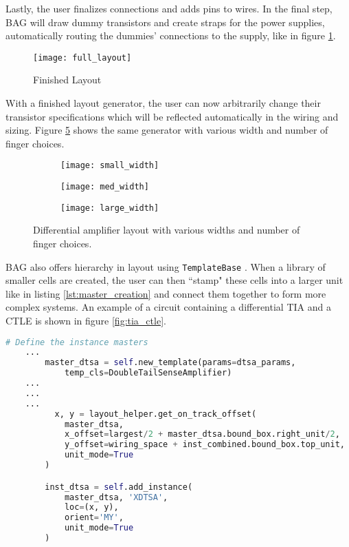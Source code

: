 Lastly, the user finalizes connections and adds pins to wires. In the final step, BAG will draw dummy transistors and create straps for the power supplies, automatically routing the dummies' connections to the supply, like in figure \ref{fig:finished_layout}.
\begin{figure}[h]
\centering
\texttt{[image: full\_layout]}
\caption{Finished Layout}
\label{fig:finished_layout}
\end{figure}
With a finished layout generator, the user can now arbitrarily change their transistor specifications which will be reflected automatically in the wiring and sizing. Figure \ref{fig:width_changes} shows the same generator with various width and number of finger choices.
\begin{figure}[h]
\centering
\begin{subfigure}{.4\linewidth}
  \centering
  \texttt{[image: small\_width]}
  \caption{}
  \label{fig:sfig1}
\end{subfigure}
\begin{subfigure}{.4\linewidth}
  \centering
\texttt{[image: med\_width]}
  \caption{}
  \label{fig:sfig2}
\end{subfigure}
\begin{subfigure}{.4\linewidth}
  \centering
\texttt{[image: large\_width]}
  \caption{}
  \label{fig:sfig2}
\end{subfigure}
\caption{Differential amplifier layout with various widths and number of finger choices.}
\label{fig:width_changes}
\end{figure}
\clearpage
BAG also offers hierarchy in layout using \texttt{TemplateBase} \cite{chang_bag2:_2018}. When a library of smaller cells are created, the user can then ``stamp" these cells into a larger unit like in listing \ref{lst:master_creation} and connect them together to form more complex systems. An example of a circuit containing a differential TIA and a CTLE is shown in figure \ref{fig:tia_ctle}.
\begin{lstlisting}[language=Python, caption=Adding and placing templates to a layout, label={lst:master_creation}, float]
# Define the instance masters
	...
        master_dtsa = self.new_template(params=dtsa_params, 
            temp_cls=DoubleTailSenseAmplifier)
	...
	...
	...
	      x, y = layout_helper.get_on_track_offset(
            master_dtsa,
            x_offset=largest/2 + master_dtsa.bound_box.right_unit/2,
            y_offset=wiring_space + inst_combined.bound_box.top_unit,
            unit_mode=True
        )

        inst_dtsa = self.add_instance(
            master_dtsa, 'XDTSA',
            loc=(x, y),
            orient='MY',
            unit_mode=True
        )
\end{lstlisting}
